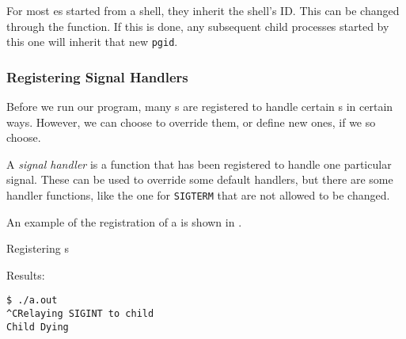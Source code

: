 \begin{remark*}
  For most es started from a shell, they inherit the shell's  ID.\@
  This can be changed through the  function.
  If this is done, any subsequent child processes started by this one will inherit that new \texttt{pgid}.
\end{remark*}

\subsubsection{Registering Signal Handlers}\label{subsubsec:Register_Signal_Handlers}
Before we run our program, many s are registered to handle certain s in certain ways.
However, we can choose to override them, or define new ones, if we so choose.

\begin{definition}\label{def:Signal_Handler}
  A \emph{signal handler} is a function that has been registered to handle one particular signal.
  These can be used to override some default handlers, but there are some handler functions, like the one for \texttt{SIGTERM} that are not allowed to be changed.
\end{definition}

An example of the registration of a  is shown in .

\begin{listing}[h!tbp]
\caption{Registering s}
\label{lst:Register_Signal_Handler}

Results:
\begin{verbatim}
$ ./a.out
^CRelaying SIGINT to child
Child Dying
\end{verbatim}
\end{listing}

